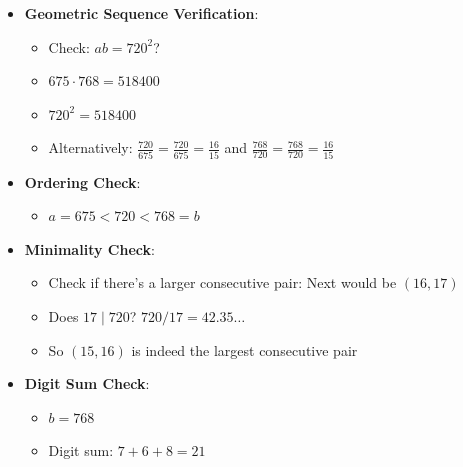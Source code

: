 \documentclass[11pt]{article}
\begin{document}
\begin{verificationbox}
\begin{itemize}[leftmargin=*]
    \item \textbf{Geometric Sequence Verification}:
    \begin{itemize}
        \item Check: $ab = 720^2$?
        \item $675 \cdot 768 = 518400$
        \item $720^2 = 518400$ \checkmark
        \item Alternatively: $\frac{720}{675} = \frac{720}{675} = \frac{16}{15}$ and $\frac{768}{720} = \frac{768}{720} = \frac{16}{15}$ \checkmark
    \end{itemize}
    
    \item \textbf{Ordering Check}:
    \begin{itemize}
        \item $a = 675 < 720 < 768 = b$ \checkmark
    \end{itemize}
    
    \item \textbf{Minimality Check}:
    \begin{itemize}
        \item Check if there's a larger consecutive pair: Next would be $(16, 17)$
        \item Does $17 \mid 720$? $720 / 17 = 42.35\ldots$ \texttimes
        \item So $(15, 16)$ is indeed the largest consecutive pair
    \end{itemize}
    
    \item \textbf{Digit Sum Check}:
    \begin{itemize}
        \item $b = 768$
        \item Digit sum: $7 + 6 + 8 = 21$ \checkmark
    \end{itemize}
\end{itemize}


\end{verificationbox}
\end{document}
